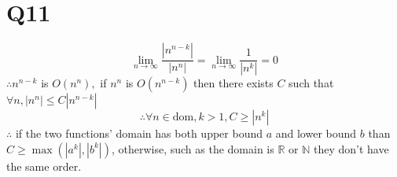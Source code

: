 \documentclass[12pt]{article}
\begin{document}
\section{Q11}
$$\lim_{n\to\infty}\frac{|n^{n-k}|}{|n^n|}=\lim_{n\to\infty}\frac{1}{|n^k|}=0$$
$\therefore n^{n-k}$ is $O(n^n),$ if $n^n$ is $O(n^{n-k})$ then there exists $C$ such that $\forall n,|n^n|\leq C|n^{n-k}|$
$$\therefore \forall n\in\mathrm{dom},k>1,C\geq|n^k|$$
$\therefore$ if the two functions' domain has both upper bound $a$ and lower bound $b$ than $C\geq\max(|a^k|,|b^k|)$, otherwise, such as the domain is $\mathbb{R}$ or $\mathbb{N}$ they don't have the same order.
\end{document}
